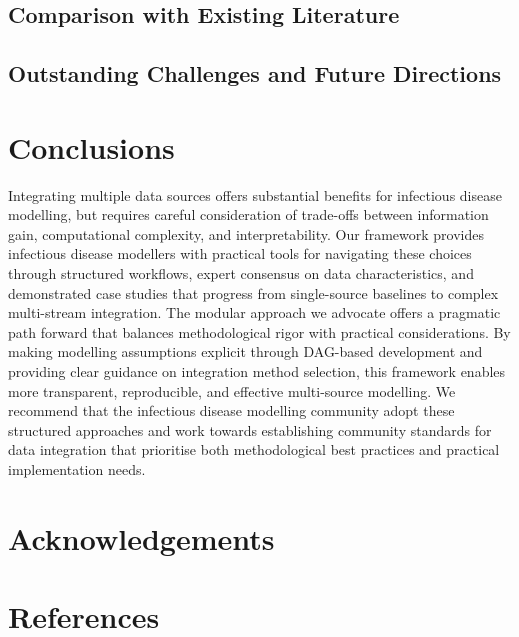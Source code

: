 \documentclass{article}
\begin{document}
\subsection{Comparison with Existing Literature}

\subsection{Outstanding Challenges and Future Directions}

\section{Conclusions}

Integrating multiple data sources offers substantial benefits for infectious disease modelling, but requires careful consideration of trade-offs between information gain, computational complexity, and interpretability.
Our framework provides infectious disease modellers with practical tools for navigating these choices through structured workflows, expert consensus on data characteristics, and demonstrated case studies that progress from single-source baselines to complex multi-stream integration.
The modular approach we advocate offers a pragmatic path forward that balances methodological rigor with practical considerations.
By making modelling assumptions explicit through DAG-based development and providing clear guidance on integration method selection, this framework enables more transparent, reproducible, and effective multi-source modelling.
We recommend that the infectious disease modelling community adopt these structured approaches and work towards establishing community standards for data integration that prioritise both methodological best practices and practical implementation needs.

\section{Acknowledgements}

\section{References}
\end{document}

